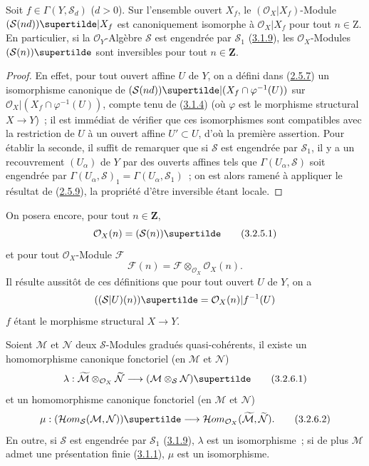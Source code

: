 \begin{proposition}[3.2.5]
\label{II.3.2.5-fr}
Soit $f\in\Gamma(Y,\mathcal{S}_d)$ ($d>0$). Sur l'ensemble ouvert $X_f$, le
$(\mathcal{O}_X|X_f)$-Module
$(\mathcal{S}(nd))\supertilde|X_f$ est canoniquement isomorphe à
$\mathcal{O}_X|X_f$ pour tout $n\in\mathrm{Z}$. En particulier, si la
$\mathcal{O}_Y$-Algèbre $\mathcal{S}$ est engendrée par $\mathcal{S}_1$
\textup{(\hyperref[II.3.1.9-fr]{3.1.9})}, les $\mathcal{O}_X$-Modules
$(\mathcal{S}(n))\supertilde$ sont inversibles pour tout $n\in\mathbf{Z}$.
\end{proposition}

\begin{proof}
En effet, pour tout ouvert affine $U$ de $Y$, on a défini dans
(\hyperref[II.2.5.7-fr]{2.5.7}) un isomorphisme canonique de
$(\mathcal{S}(nd))\supertilde|(X_f\cap\varphi^{-1}(U))$ sur
$\mathcal{O}_X|(X_f\cap\varphi^{-1}(U))$, compte tenu de
(\hyperref[II.3.1.4-fr]{3.1.4}) (où $\varphi$ est le morphisme structural
$X\to Y$)~; il est immédiat de vérifier que ces isomorphismes sont compatibles
avec la restriction de $U$ à un ouvert affine $U'\subset U$, d'où la première
assertion. Pour établir la seconde, il suffit de remarquer que si
$\mathcal{S}$ est engendrée par $\mathcal{S}_1$, il y a un recouvrement
$(U_\alpha)$ de $Y$ par des ouverts affines tels que
$\Gamma(U_\alpha,\mathcal{S})$ soit engendrée par
$\Gamma(U_\alpha,\mathcal{S})_1=\Gamma(U_\alpha,\mathcal{S}_1)$~; on est alors
ramené à appliquer le résultat de (\hyperref[II.2.5.9-fr]{2.5.9}), la
propriété d'être inversible étant locale.
\end{proof}

On posera encore, pour tout $n\in\mathbf{Z}$,
\[
\label{II.3.2.5.1-fr}
  \mathcal{O}_X(n)=(\mathcal{S}(n))\supertilde
\tag{3.2.5.1}
\]
et pour tout $\mathcal{O}_X$-Module $\mathcal{F}$
\[
\label{II.3.2.5.2-fr}
  \mathcal{F}(n)=\mathcal{F}\otimes_{\mathcal{O}_X}\mathcal{O}_X(n).
\tag{3.2.5.2}
\]
Il résulte aussitôt de ces définitions que pour tout ouvert $U$ de $Y$, on a
\[
  ((\mathcal{S}|U)(n))\supertilde
  =\mathcal{O}_X(n)|f^{-1}(U)
\]
$f$ étant le morphisme structural $X\to Y$.

\begin{proposition}[3.2.6]
\label{II.3.2.6-fr}
Soient $\mathcal{M}$ et $\mathcal{N}$ deux $\mathcal{S}$-Modules gradués
quasi-cohérents, il existe un homomorphisme canonique fonctoriel (en
$\mathcal{M}$ et $\mathcal{N}$)
\[
\label{II.3.2.6.1-fr}
  \lambda:\widetilde{\mathcal{M}}
  \otimes_{\mathcal{O}_X}\widetilde{\mathcal{N}}
  \longrightarrow(\mathcal{M}\otimes_{\mathcal{S}}\mathcal{N})\supertilde
\tag{3.2.6.1}
\]
et un homomorphisme canonique fonctoriel (en $\mathcal{M}$ et
$\mathcal{N}$)
\[
\label{II.3.2.6.2-fr}
  \mu:(\mathcal{H}om_{\mathcal{S}}(\mathcal{M},\mathcal{N}))\supertilde
  \longrightarrow
  \mathcal{H}om_{\mathcal{O}_X}
  (\widetilde{\mathcal{M}},\widetilde{\mathcal{N}}).
\tag{3.2.6.2}
\]
En outre, si $\mathcal{S}$ est engendrée par $\mathcal{S}_1$
\textup{(\hyperref[II.3.1.9-fr]{3.1.9})}, $\lambda$ est un isomorphisme~; si de plus
$\mathcal{M}$ admet une présentation finie
\textup{(\hyperref[II.3.1.1-fr]{3.1.1})}, $\mu$ est un isomorphisme.
\end{proposition}

